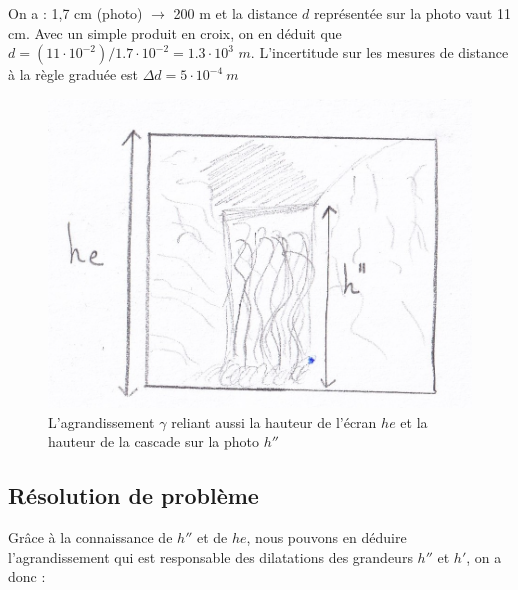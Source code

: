 \documentclass[12pt,a4paper]{article}
\begin{document}
On a : 1,7 cm (photo) $\longrightarrow$ 200 m et la distance $d$ représentée sur la photo vaut 11 cm.
Avec un simple produit en croix, on en déduit que $d = (11\cdot10^{-2})/1.7\cdot10^{-2} = 1.3\cdot10^3$ $m$. L'incertitude sur les mesures de distance à la règle graduée est $\Delta d = 5\cdot10^{-4}~m$

\begin{figure}[H]
\begin{center}
\includegraphics[scale=0.8]{Figures/schéma2.jpg}   
\caption{L'agrandissement $\gamma$ reliant aussi la hauteur de l'écran $he$ et la hauteur de la cascade sur la photo $h''$}
\end{center}
\end{figure}

\subsection{Résolution de problème}
Grâce à la connaissance de $h''$ et de $he$, nous pouvons en déduire l'agrandissement qui est responsable des dilatations des grandeurs $h''$ et $h'$, on a donc : 
\end{document}
